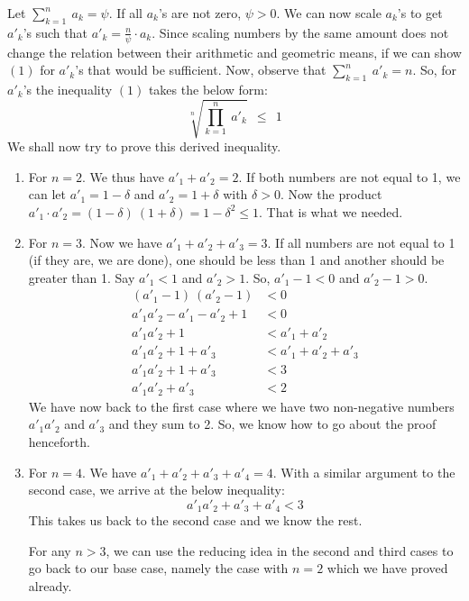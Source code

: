 \documentclass{article}
\begin{document}
Let $\sum_{k=1}^{n}\ a_k = \psi$. If all $a_k$'s are not zero, $\psi > 0$. We can now scale $a_k$'s to get $a'_k$'s such that $a'_k = \frac{n}{\psi} \cdot a_k$. Since scaling numbers by the same amount does not change the relation between their arithmetic and geometric means, if we can show $(1)$ for $a'_k$'s that would be sufficient. Now, observe that $\sum_{k=1}^{n}\ a'_k = n$. So, for $a'_k$'s the inequality $(1)$ takes the below form:
\[
	\sqrt[n]{ \prod_{k=1}^{n}\ a'_k }\ \  \leq\ \  1
\]
We shall now try to prove this derived inequality.
\begin{enumerate}
	\item For $n = 2$. We thus have $a'_1 + a'_2 = 2$. If both numbers are not equal to 1, we can let $a'_1 = 1-\delta$ and $a'_2 = 1+\delta$ with $\delta > 0$. Now the product $a'_1 \cdot a'_2 = (1-\delta)\ (1+\delta) = 1 - \delta^2 \leq 1$. That is what we needed.
	\item For $n=3$. Now we have $a'_1 + a'_2 + a'_3 = 3$. If all numbers are not equal to 1 (if they are, we are done), one should be less than 1 and another should be greater than 1. Say $a'_1 < 1$ and $a'_2 > 1$. So, $a'_1 - 1 < 0$ and $a'_2-1 > 0$.
	\begin{equation*}
		\begin{aligned}
			\left( a'_1 - 1 \right)\ \left( a'_2-1 \right) &< 0\\
			a'_1a'_2-a'_1-a'_2+1 &< 0\\
			a'_1a'_2+1 &< a'_1 + a'_2\\
			a'_1a'_2+1 + a'_3 &< a'_1 + a'_2 + a'_3\\
			a'_1a'_2+1 + a'_3 &< 3\\
			a'_1a'_2 + a'_3 &< 2
		\end{aligned}
	\end{equation*}
We have now back to the first case where we have two non-negative numbers $a'_1a'_2$ and $a'_3$ and they sum to 2. So, we know how to go about the proof henceforth.
	\item For $n=4$. We have $a'_1 + a'_2 + a'_3 + a'_4 = 4$.  With a similar argument to the second case, we arrive at the below inequality:
	\[
		a'_1a'_2 + a'_3 + a'_4 < 3
	\]
This takes us back to the second case and we know the rest.

For any $n > 3$, we can use the reducing idea in the second and third cases to go back to our base case, namely the case with $n=2$ which we have proved already.
\end{enumerate}
\end{document}

